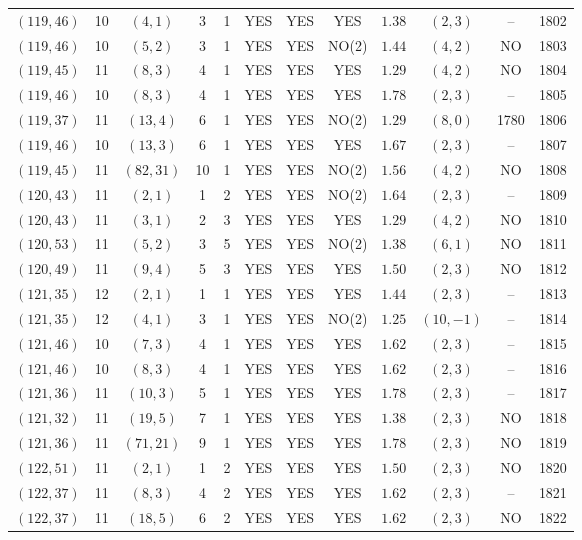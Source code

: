 \begin{longtable}{|c|c|c|c|c|c|c|c|c|c|c|c|}
$(119,46)$ & 10 & $(4,1)$ & 3 & 1 & YES & YES & YES & $1.38$ & $(2,3)$ & -- & 1802\\
$(119,46)$ & 10 & $(5,2)$ & 3 & 1 & YES & YES & NO(2) & $1.44$ & $(4,2)$ & NO & 1803\\
$(119,45)$ & 11 & $(8,3)$ & 4 & 1 & YES & YES & YES & $1.29$ & $(4,2)$ & NO & 1804\\
$(119,46)$ & 10 & $(8,3)$ & 4 & 1 & YES & YES & YES & $1.78$ & $(2,3)$ & -- & 1805\\
$(119,37)$ & 11 & $(13,4)$ & 6 & 1 & YES & YES & NO(2) & $1.29$ & $(8,0)$ & 1780 & 1806\\
$(119,46)$ & 10 & $(13,3)$ & 6 & 1 & YES & YES & YES & $1.67$ & $(2,3)$ & -- & 1807\\
$(119,45)$ & 11 & $(82,31)$ & 10 & 1 & YES & YES & NO(2) & $1.56$ & $(4,2)$ & NO & 1808\\
$(120,43)$ & 11 & $(2,1)$ & 1 & 2 & YES & YES & NO(2) & $1.64$ & $(2,3)$ & -- & 1809\\
$(120,43)$ & 11 & $(3,1)$ & 2 & 3 & YES & YES & YES & $1.29$ & $(4,2)$ & NO & 1810\\
$(120,53)$ & 11 & $(5,2)$ & 3 & 5 & YES & YES & NO(2) & $1.38$ & $(6,1)$ & NO & 1811\\
$(120,49)$ & 11 & $(9,4)$ & 5 & 3 & YES & YES & YES & $1.50$ & $(2,3)$ & NO & 1812\\
$(121,35)$ & 12 & $(2,1)$ & 1 & 1 & YES & YES & YES & $1.44$ & $(2,3)$ & -- & 1813\\
$(121,35)$ & 12 & $(4,1)$ & 3 & 1 & YES & YES & NO(2) & $1.25$ & $(10,-1)$ & -- & 1814\\
$(121,46)$ & 10 & $(7,3)$ & 4 & 1 & YES & YES & YES & $1.62$ & $(2,3)$ & -- & 1815\\
$(121,46)$ & 10 & $(8,3)$ & 4 & 1 & YES & YES & YES & $1.62$ & $(2,3)$ & -- & 1816\\
$(121,36)$ & 11 & $(10,3)$ & 5 & 1 & YES & YES & YES & $1.78$ & $(2,3)$ & -- & 1817\\
$(121,32)$ & 11 & $(19,5)$ & 7 & 1 & YES & YES & YES & $1.38$ & $(2,3)$ & NO & 1818\\
$(121,36)$ & 11 & $(71,21)$ & 9 & 1 & YES & YES & YES & $1.78$ & $(2,3)$ & NO & 1819\\
$(122,51)$ & 11 & $(2,1)$ & 1 & 2 & YES & YES & YES & $1.50$ & $(2,3)$ & NO & 1820\\
$(122,37)$ & 11 & $(8,3)$ & 4 & 2 & YES & YES & YES & $1.62$ & $(2,3)$ & -- & 1821\\
$(122,37)$ & 11 & $(18,5)$ & 6 & 2 & YES & YES & YES & $1.62$ & $(2,3)$ & NO & 1822\\

\end{longtable}
